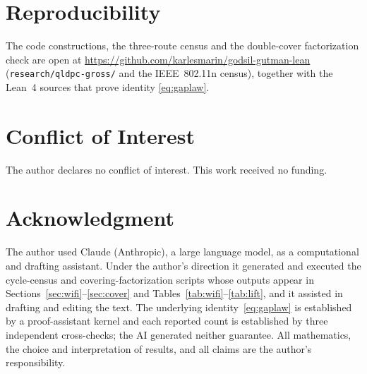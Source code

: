 \documentclass[journal]{IEEEtran}
\begin{document}
\section*{Reproducibility}
The code constructions, the three-route census and the double-cover factorization check are
open at \url{https://github.com/karlesmarin/godsil-gutman-lean} (\texttt{research/qldpc-gross/}
and the IEEE~802.11n census), together with the Lean~4 sources that prove identity
\eqref{eq:gaplaw}.

\section*{Conflict of Interest}
The author declares no conflict of interest. This work received no funding.

\section*{Acknowledgment}
The author used Claude (Anthropic), a large language model, as a computational and drafting
assistant. Under the author's direction it generated and executed the cycle-census and
covering-factorization scripts whose outputs appear in Sections~\ref{sec:wifi}--\ref{sec:cover}
and Tables~\ref{tab:wifi}--\ref{tab:lift}, and it assisted in drafting and editing the text.
The underlying identity~\eqref{eq:gaplaw} is established by a proof-assistant kernel and each
reported count is established by three independent cross-checks; the AI generated neither
guarantee. All mathematics, the choice and interpretation of results, and all claims are the
author's responsibility.
\end{document}
